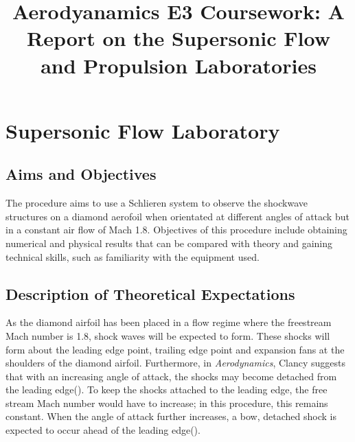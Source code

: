\documentclass[stu, a4paper, 12pt, floatsintext]{apa7}
\title{Aerodyanamics E3 Coursework: A Report on the Supersonic Flow and Propulsion Laboratories}
\numberwithin{figure}{section}
\numberwithin{table}{section}
\numberwithin{equation}{section}
\begin{document}
\maketitle{} %

\tableofcontents

\newpage

\listoffigures
{}
\listoftables
{}
\listofmyequations

\newpage
\section{Supersonic Flow Laboratory}
\subsection{Aims and Objectives}
The procedure aims to use a Schlieren system to observe the shockwave structures on a diamond aerofoil when orientated at different angles of attack but in a constant air flow of Mach 1.8. Objectives of this procedure include obtaining numerical and physical results that can be compared with theory and gaining technical skills, such as familiarity with the equipment used.
\subsection{Description of Theoretical Expectations}
As the diamond airfoil has been placed in a flow regime where the freestream Mach number is 1.8, shock waves will be expected to form. These shocks will form about the leading edge point, trailing edge point and expansion fans at the shoulders of the diamond airfoil. Furthermore, in \textit{Aerodynamics}, Clancy suggests that with an increasing angle of attack, the shocks may become detached from the leading edge(\cite{Clancy1986}). To keep the shocks attached to the leading edge, the free stream Mach number would have to increase; in this procedure, this remains constant. When the angle of attack further increases, a bow, detached shock is expected to occur ahead of the leading edge(\cite{Clancy1986}). 
\end{document}
